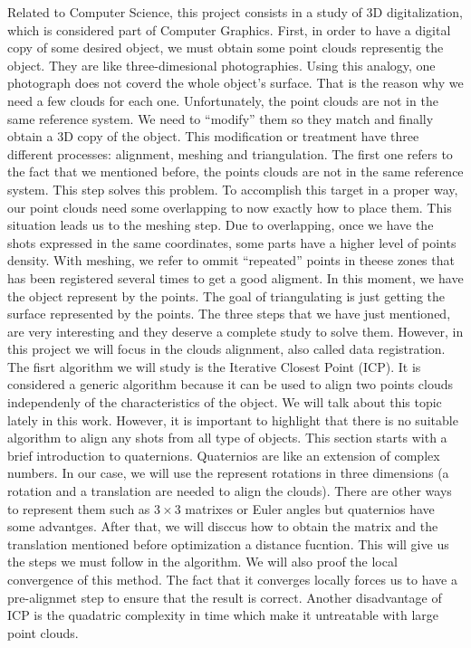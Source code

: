 Related to Computer Science, this project consists in a study of 3D digitalization, which is considered part of Computer Graphics. First, in order to have a digital copy of some desired object, we must obtain some point clouds representig the object. They are like three-dimesional photographies. Using this analogy, one photograph does not coverd the whole object's surface. That is the reason why we need a few clouds for each one. Unfortunately, the point clouds are not in the same reference system. We need to ``modify'' them so they match and finally obtain a 3D copy of the object. This modification or treatment have three different processes: alignment, meshing and triangulation. The first one refers to the fact that we mentioned before, the points clouds are not in the same reference system. This step solves this problem. To accomplish this target in a proper way, our point clouds need some overlapping to now exactly how to place them. This situation leads us to the meshing step. Due to overlapping, once we have the shots expressed in the same coordinates, some parts have a higher level of points density. With meshing, we refer to ommit ``repeated'' points in theese zones that has been registered several times to get a good aligment. In this moment, we have the object represent by the points. The goal of triangulating is just getting the surface represented by the points. The three steps that we have just mentioned, are very interesting and they deserve a complete study to solve them. However, in this project we will focus in the clouds alignment, also called data registration. \\

The fisrt algorithm we will study is the Iterative Closest Point (ICP). It is considered a generic algorithm because it can be used to align two points clouds independenly of the characteristics of the object. We will talk about this topic lately in this work. However, it is important to highlight that there is no suitable algorithm to align any shots from all type of objects. This section starts with a brief introduction to quaternions. Quaternios are like an extension of complex numbers. In our case, we will use the represent rotations in three dimensions (a rotation and a translation are needed to align the clouds). There are other  ways to represent them such as $ 3 \times 3$ matrixes or Euler angles but quaternios have some advantges. After that, we will disccus how to obtain the matrix and the translation mentioned before optimization a distance fucntion. This will give us the steps we must follow in the algorithm. We will also proof the local convergence of this method. The fact that it converges locally forces us to have a pre-alignmet step to ensure that the result is correct. Another disadvantage of ICP is the quadatric complexity in time which make it untreatable with large point clouds. \\


